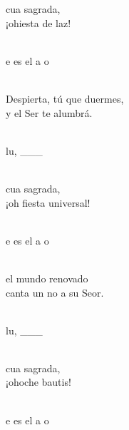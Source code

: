\documentclass[12pt]{article}
\begin{document}
\begin{multicols*}{2}
\begin{cancion}%
	cua sagrada,\\
	¡ohiesta de laz!\\\jump\\
	\begin{chorus}%
	e es el a  o \\
	\end{chorus}%
	\jump\\
Despierta, tú que duermes,\\
	y el Ser te alumbrá.\\\jump\\
	\begin{chorus}%
	lu, ___\\
	\end{chorus}%
	\jump\\
	cua sagrada,\\
¡oh fiesta universal!\\\jump\\
	\begin{chorus}%
	e es el a  o \\
	\end{chorus}%
	\jump\\
el mundo renovado\\
	canta un no a su Seor.\\\jump\\
	\begin{chorus}%
	lu, ___\\
	\end{chorus}%
	\jump\\
	cua sagrada,\\
	¡ohoche bautis!\\\jump\\
	\begin{chorus}%
	e es el a  o \\
	\end{chorus}%

\end{cancion}
\end{multicols*}
\end{document}
